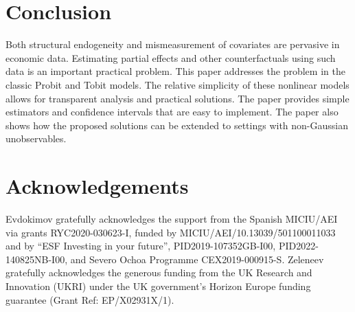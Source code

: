 \documentclass[12pt]{article}
\begin{document}
\bigskip

\section{Conclusion}

Both structural endogeneity and mismeasurement of covariates are pervasive
in economic data. Estimating partial effects and other counterfactuals using
such data is an important practical problem. This paper addresses the
problem in the classic Probit and Tobit models. The relative simplicity of
these nonlinear models allows for transparent analysis and practical
solutions. The paper provides simple estimators and confidence intervals
that are easy to implement. The paper also shows how the proposed solutions
can be extended to settings with non-Gaussian unobservables.

\bigskip

\section*{Acknowledgements}
Evdokimov gratefully acknowledges the support from the Spanish MICIU/AEI via grants RYC2020-030623-I, funded by MICIU/AEI/10.13039/501100011033 and by ``ESF Investing in your future'', PID2019-107352GB-I00, PID2022-140825NB-I00, and Severo Ochoa Programme CEX2019-000915-S. Zeleneev gratefully acknowledges the generous funding from the UK Research and Innovation (UKRI) under the UK government’s Horizon Europe funding
guarantee (Grant Ref: EP/X02931X/1).

\bigskip

\nocite{NLSY97}




\bigskip
\end{document}
